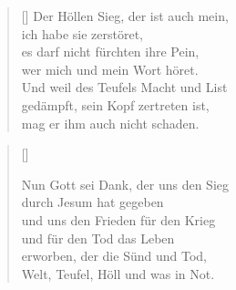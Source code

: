 \begin{multicols}{2}
\begin{verse}[\versewidth]
 Der Höllen Sieg, der ist auch mein,\\
ich habe sie zerstöret,\\
es darf nicht fürchten ihre Pein,\\
wer mich und mein Wort höret.\\
Und weil des Teufels Macht und List\\
gedämpft, sein Kopf zertreten ist,\\
mag er ihm auch nicht schaden.
\end{verse}
\end{multicols}

\begin{center}
\settowidth{\versewidth}{Der, vor dem die Welt erschrickt,}
\begin{verse}[\versewidth]

 Nun Gott sei Dank, der uns den Sieg\\
durch Jesum hat gegeben\\
und uns den Frieden für den Krieg\\
und für den Tod das Leben\\
erworben, der die Sünd und Tod,\\
Welt, Teufel, Höll und was in Not.

\end{verse}
\end{center}

